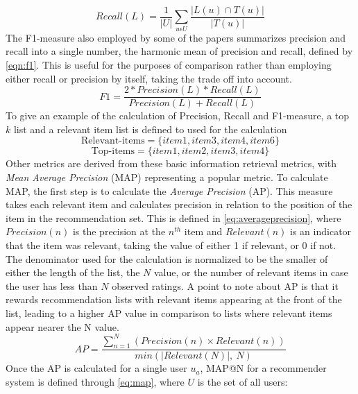 \begin{equation}
    \label{eqn:recall}
    Recall(L) = \frac{1}{|U|} \sum\limits_{u \epsilon U} \frac{|L(u) \cap T(u)|}{|T(u)|}
\end{equation}
The F1-measure also employed by some of the papers summarizes precision and recall into a single number, the harmonic mean of precision and recall, defined by \autoref{eqn:f1}.
This is useful for the purposes of comparison rather than employing either recall or precision by itself, taking the trade off into account.
\begin{equation}
    \label{eqn:f1}
    F1 = \frac{2*Precision(L)*Recall(L)}{Precision(L)+Recall(L)}
\end{equation}
To give an example of the calculation of Precision, Recall and F1-measure, a top $k$ list and a relevant item list is defined to used for the calculation
\begin{equation}
    \text{Relevant-items} = \{item1, item3, item4, item6\}
\end{equation}
\begin{equation}
    \text{Top-items} = \{item1, item2, item3, item4\}
\end{equation}
Other metrics are derived from these basic information retrieval metrics, with \textit{Mean Average Precision} (MAP) representing a popular metric\cite{ChoosingMetricsEvaluation}.
To calculate MAP, the first step is to calculate the \textit{Average Precision} (AP).
This measure takes each relevant item and calculates precision in relation to the position of the item in the recommendation set.
This is defined in \autoref{eq:averageprecision}, where $Precision(n)$ is the precision at the $n^{th}$ item and $Relevant(n)$ is an indicator that the item was relevant, taking the value of either 1 if relevant, or 0 if not.
The denominator used for the calculation is normalized to be the smaller of either the length of the list, the $N$ value, or the number of relevant items in case the user has less than $N$ observed ratings.
A point to note about AP is that it rewards recommendation lists with relevant items appearing at the front of the list, leading to a higher AP value in comparison to lists where relevant items appear nearer the N value. 
\begin{equation}
    \label{eq:averageprecision}
    AP = \frac{\sum\limits_{n=1}^N (Precision(n) \times Relevant(n))}{min(|Relevant(N)|,\:N)}
\end{equation}
Once the AP is calculated for a single user $u_a$, MAP@N for a recommender system is defined through \autoref{eq:map}, where $U$ is the set of all users: 
